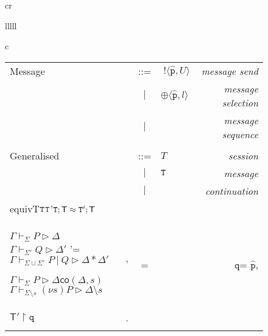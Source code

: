 \documentclass{LMCS}
\newcommand{\ptilde}[1]{{\ensuremath{#1}}}
\newcommand{\participant}[1]{\ensuremath{\mathtt{#1}}}
\newcommand{\q}{\ensuremath{\participant{q}}}
\newcommand{\p}{\ensuremath{\participant{p}}}
\newcommand{\s}{\ensuremath{s}}
\newcommand{\at}[1]{\ensuremath{\ptilde{#1}}}
\newcommand{\Par}{\ensuremath{\ |\ }}
\newcommand{\sep}{\ensuremath{~\mathbf{|}~ }}
\newcommand{\pro}[2]{\ensuremath{#1\upharpoonright#2}}
\newcommand{\Ga}{\ensuremath{\Gamma}}
\newcommand{\D}{\ensuremath{\Delta}}
\newcommand{\T}{\ensuremath{T}}
\newcommand{\TQ}{\ensuremath{{\tt{T}}}}
\newcommand{\TG}{\ensuremath{{\mathsf{T}}}}
\newcommand{\UT}{\ensuremath{U}}
\newcommand{\oT}[2]{\ensuremath{\;!\langle #2,#1\rangle}}
\newcommand{\der}[3]{\ensuremath{#1\vdash#2\triangleright#3}}
\newcommand{\seltypes}{\ensuremath{\oplus\langle\pv,l\rangle}}
\newcommand{\trule}[1]{\text{\footnotesize{\ensuremath{\lfloor\text{\sc{#1}}\rfloor}}}}
\newcommand{\equivT}[2]{\ensuremath{#1\approx #2}}
\newcommand{\derqq}[4]{\ensuremath{#1 \vdash_{#2} #3 \triangleright #4}}
\newcommand{\ms}[2]{\ensuremath{{#1}\setminus{#2}}}
\newcommand{\coe}[2]{\ensuremath{\mathsf{co}({#1},{#2})}}
\newcommand{\Dcomp}{\ensuremath{\ast}}
\newcommand{\Tcomp}{\ensuremath{;}}
\newcommand{\pv}{\ensuremath{\at{\hat{\p}}}}
\newcommand{\PP}{\ensuremath{P}}
\newcommand{\Q}{\ensuremath{Q}}
\newcommand{\subT}{\ensuremath{\leq}}
\newcommand{\WB}{\approx}
\begin{document}
{\begin{figure}[t]
\begin{tabular}{cr}
{\begin{array}{lllll}
\begin{center}
\begin{tabular}{c}
\begin{tabular}{lrclr}
  Message &  & ::= &
         \oT\UT{\pv} & \emph{message send}\\
         &     & \sep  & \seltypes &\emph{message selection}\\
         &     & \sep  &  &\emph{message sequence}\\
\\
  Generalised \quad\quad\quad &  & ::= &
         \T
  & \emph{session}\\
         &     & \sep & \TQ &\ \emph{message}\\
         &     & \sep &  &\ \emph{continuation}\\equivT{\TQ}{\TQ'}\text{ implies }\equivT{\TQ;\TG}{\TQ';\TG}
\begin{array}{c}
 \begin{prooftree}
\der{\Ga}{\PP}{\D} \justifies \derqq{\Ga}{\emptyset}{\PP }{\D}
\using\trule{GInit}
\end{prooftree}
\ 
\begin{prooftree}
\derqq{\Ga}{\Sigma}{\PP}{\D}\quad \D \WB \D'
\justifies
\derqq{\Ga}{\Sigma}{\PP }{\D'}\using\trule{Equiv}
\end{prooftree}
\begin{prooftree}
\derqq{\Ga}{\Sigma}{\PP}{\D}\quad \D \subT \D'
\justifies
\derqq{\Ga}{\Sigma}{\PP }{\D'}\using\trule{Subs}
\end{prooftree}
\\\\
\begin{prooftree}
\derqq{\Ga}{\Sigma}{\PP}{\D}\quad \derqq{\Ga}{\Sigma'}{\Q}{\D'}
\quad \Sigma\cap\Sigma'=\emptyset
 \justifies
\derqq{\Ga}{\Sigma\cup\Sigma'}{\PP\Par \Q}{\D \Dcomp \D'}
 \using \trule{GPar}
 \end{prooftree}
\quad 
\begin{prooftree}
\derqq{\Ga}{\Sigma}{\PP}{\D}\quad \coe\D\s \justifies
\derqq{\Ga}{\Sigma\setminus\s}{(\nu\s)\PP }{\ms\D\s}
\using\trule{GSRes}
\end{prooftree}
\end{array}
-.2em]
    \TG'\Tcomp \TG   & \text{if  is a message type}, \
\begin{array}{rcl}
\pro{(\oT\UT{\pv};\TG')}\q&=&\begin{cases}
  !\UT;\pro{\TG'}\q  & \text{if }\q = \pv, \\
   \pro{\TG'}\q & \text{otherwise}.
\end{cases}\\

\end{array}
\end{tabular}
\end{tabular}
\end{center}
\end{array}}
\end{tabular}
\end{figure}}
\end{document}
